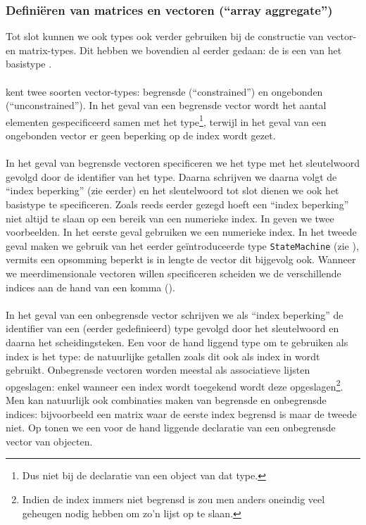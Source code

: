 \subsubsection{Defini\"eren van matrices en vectoren (``array aggregate'')}
Tot slot kunnen we ook types ook verder gebruiken bij de constructie van vector- en matrix-types. Dit hebben we bovendien al eerder gedaan: de  is een  van het basistype .

\paragraph{}
\tvhdl{} kent twee soorten vector-types: begrensde (``constrained'') en ongebonden (``unconstrained''). In het geval van een begrensde vector wordt het aantal elementen gespecificeerd samen met het type\footnote{Dus niet bij de declaratie van een object van dat type.}, terwijl in het geval van een ongebonden vector er geen beperking op de index wordt gezet.

\paragraph{}
In het geval van begrensde vectoren specificeren we het type met het sleutelwoord  gevolgd door de identifier van het type. Daarna schrijven we   daarna volgt de ``index beperking'' (zie eerder) en het sleutelwoord  tot slot dienen we ook het basistype te specificeren. Zoals reeds eerder gezegd hoeft een ``index beperking'' niet altijd te slaan op een bereik van een numerieke index. In  geven we twee voorbeelden. In het eerste geval gebruiken we een numerieke index. In het tweede geval maken we gebruik van het eerder ge\"introduceerde type \texttt{StateMachine} (zie ), vermits een opsomming beperkt is in lengte de vector dit bijgevolg ook. Wanneer we meerdimensionale vectoren willen specificeren scheiden we de verschillende indices aan de hand van een komma (\vhdltermen{,}).

\paragraph{}
In het geval van een onbegrensde vector schrijven we als ``index beperking'' de identifier van een (eerder gedefinieerd) type gevolgd door het  sleutelwoord en daarna het \vhdltermen{<>} scheidingsteken. Een voor de hand liggend type om te gebruiken als index is het  type: de natuurlijke getallen zoals dit ook als index in \tjava{} wordt gebruikt. Onbegrensde vectoren worden meestal als associatieve lijsten opgeslagen: enkel wanneer een index wordt toegekend wordt deze opgeslagen\footnote{Indien de index immers niet begrensd is zou men anders oneindig veel geheugen nodig hebben om zo'n lijst op te slaan.}. Men kan natuurlijk ook combinaties maken van begrensde en onbegrensde indices: bijvoorbeeld een matrix waar de eerste index begrensd is maar de tweede niet. Op  tonen we een voor de hand liggende declaratie van een onbegrensde vector van  objecten.


